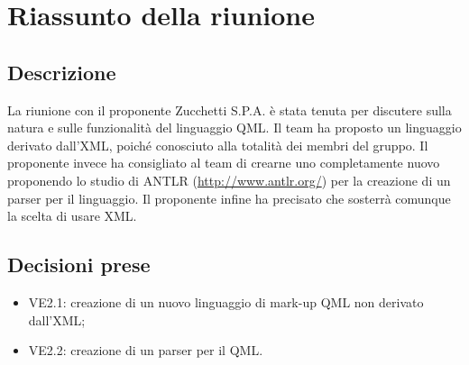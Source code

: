 \section{Riassunto della riunione}
\subsection{Descrizione}

La riunione con il proponente Zucchetti S.P.A. è stata tenuta per discutere sulla natura e sulle funzionalità del linguaggio QML. Il team ha proposto un linguaggio derivato dall'XML, poiché conosciuto alla totalità dei membri del gruppo. Il proponente invece ha consigliato al team di crearne uno completamente nuovo proponendo lo studio di ANTLR (\url{http://www.antlr.org/}) per la creazione di un parser per il linguaggio. Il proponente infine ha precisato che sosterrà comunque la scelta di usare XML.

\subsection{Decisioni prese}
\begin{itemize}
	\item VE2.1: creazione di un nuovo linguaggio di mark-up QML non derivato dall'XML;
	\item VE2.2: creazione di un parser per il QML.
\end{itemize}
